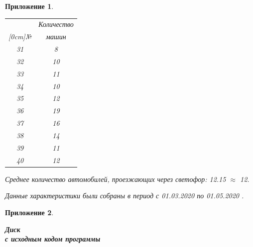 \documentclass[12pt, a4paper]{extarticle}
\numberwithin{equation}{section}
\newtheorem{attachment}{\hspace{12cm}  Приложение}
\numberwithin{figure}{section}
\begin{document}
\begin{attachment}
\begin{table}[h!]
\begin{minipage}{0.23\linewidth}
		\begin{tabular}{|c|c|}
			\hline
			& Количество \\ 
			\raisebox{1.5ex}[0cm]{№}
			& машин 
			\\\hline
			31 & 8
			\\\hline
			32 & 10
			\\\hline
			33 & 11
			\\\hline
			34 & 10
			\\\hline
			35 & 12
			\\\hline
			36 & 19
			\\\hline
			37 & 16
			\\\hline
			38 & 14
			\\\hline
			39 & 11
			\\\hline
			40 & 12
			\\\hline
		\end{tabular}
	\end{minipage}
\end{table}
\noindent Среднее количество автомобилей, проезжающих через светофор: 12.15 $\approx$ 12.
\newline

\noindent\textup{Данные характеристики были собраны в период с 01.03.2020 по 01.05.2020 }.
\end{attachment}


\newpage

\begin{attachment} \label{att2}
	\begin{center}
		\vspace{1cm}
		\rm{\Large{\textbf{ Диск \\ с исходным кодом программы }}}
		\vspace{\baselineskip}
	\end{center}
\end{attachment}
\end{document}

